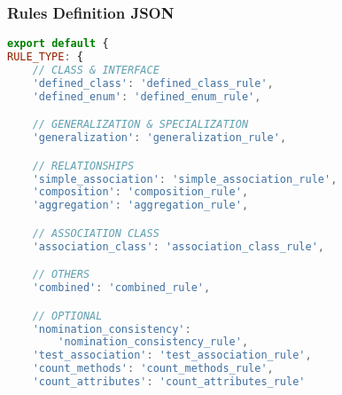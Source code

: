\subsubsection{Rules Definition JSON}
\begin{lstlisting}[caption={Rules Definition JSON}, label={lst:rules_def}, language=javascript]
export default {
RULE_TYPE: {
    // CLASS & INTERFACE
    'defined_class': 'defined_class_rule',
    'defined_enum': 'defined_enum_rule',

    // GENERALIZATION & SPECIALIZATION
    'generalization': 'generalization_rule',

    // RELATIONSHIPS
    'simple_association': 'simple_association_rule',
    'composition': 'composition_rule',
    'aggregation': 'aggregation_rule',

    // ASSOCIATION CLASS
    'association_class': 'association_class_rule',

    // OTHERS
    'combined': 'combined_rule',

    // OPTIONAL
    'nomination_consistency':
        'nomination_consistency_rule',
    'test_association': 'test_association_rule',
    'count_methods': 'count_methods_rule',
    'count_attributes': 'count_attributes_rule'


\end{lstlisting}
